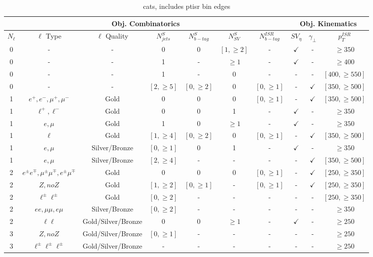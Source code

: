 \begin{table}
\label{tab:cats}
\caption{cats, includes ptisr bin edges}
\begin{adjustwidth}{-0.7in}{-1in}

\begin{tabular}{|c|c|c|c|c|c|c|c|c|c|}
\multicolumn{7}{c|}{Obj. Combinatorics} & \multicolumn{3}{c}{Obj. Kinematics} \\
\hline 
$N_\ell$ &  $\ell$ Type & $\ell$ Quality & $N_{jets}^{S}$ & $N_{b-tag}^{S}$ & $N_{SV}^S$ & $N_{b-tag}^{ISR}$ & $SV_\eta$ & $\gamma_\perp$ & $p_T^{ISR}$ \\ 
\hline
\hline 
0 & - & - & 0 & 0 & $[1,\geq 2]$ & - & $\checkmark$ & - & $\geq 350$ \\ 
0 & - & - & 1 & - & $\geq 1$ &    - & $\checkmark$ & - & $\geq 400$ \\
0 & - & - & 1 & - &  0       &    - &  -           & - & $[400,\geq 550]$ \\
0 & - & - & $[2,\geq 5]$ & $[0,\geq 2]$ & 0 & $[0,\geq 1]$ & - & $\checkmark$ & $[350,\geq500]$ \\
\hline 
1 & $e^+,e^-,\mu^+,\mu^-$& Gold & 0 & 0 & 0 & $[0,\geq 1]$ & - & $\checkmark$ & $[350, \geq 500]$ \\
1 & $\ell^+, \ell^-$  & Gold & 0 & 0 & 1 & - & $\checkmark$ & - & $\geq 350$ \\
1 & $e, \mu$ & Gold & 1 & 0 &  $\geq 1$ & - & $\checkmark$ & - & $\geq 350$ \\
1 & $\ell$ & Gold & $[1,\geq 4]$ & $[0,\geq 2]$ & 0 & $[0,\geq 1]$ & - & $\checkmark$ & $[350, \geq 500]$ \\
1 & $e, \mu$ & Silver/Bronze & $[0,\geq 1]$ & 0 & 1 & - & $\checkmark$ & - & $\geq 350$ \\
1 & $e, \mu$ & Silver/Bronze & $[2, \geq 4]$ & - & - & - & - & $\checkmark$ & $[350, \geq 500]$ \\
\hline
2 & $e^\pm e^\mp, \mu^\pm \mu^\mp, e^\pm \mu^\mp $ & Gold & 0 & 0 & 0 & $[0,\geq 1]$ & - & $\checkmark$ & $[250,\geq350]$  \\
2 & $Z, no Z$ & Gold & $[1,\geq 2]$ & $[0, \geq 1]$& - & $[0,\geq 1]$ & - & $\checkmark$ & $[250,\geq350]$  \\
2 & $\ell^\pm \ell^\pm$ & Gold & $[0,\geq 2]$ & - & - &  - & - & - & $[250,\geq350]$ \\
2 & $ee, \mu\mu, e\mu$ & Silver/Bronze & $[0,\geq 2]$ & - & - & - & - & - & $\geq350$ \\
2 & $\ell \ell$ & Gold/Silver/Bronze & 0 & 0 & $\geq 1 $ & - & $\checkmark$ & - & $\geq 250$\\
\hline
3 & $Z, no Z$ & Gold/Silver/Bronze & $[0,\geq 1]$ & - & - & - & - & - & $\geq 250$ \\
3 & $\ell^\pm \ell^\pm \ell^\pm$ & Gold/Silver/Bronze & - & - & -& - & - & -& $\geq 250$ \\
\hline
\end{tabular} 
\end{adjustwidth}
\end{table}



